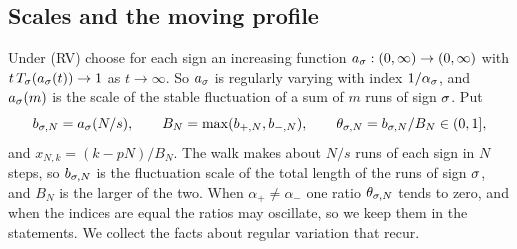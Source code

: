 \subsection{Scales and the moving profile}\label{sec:scales}

Under (RV) choose for each sign an increasing function
$a_\sigma:(0,\infty)\to(0,\infty)$ with $t\,T_\sigma(a_\sigma(t))\to1$ as
$t\to\infty$. So $a_\sigma$ is regularly varying with index $1/\alpha_\sigma$, and
$a_\sigma(m)$ is the scale of the stable fluctuation of a sum of $m$ runs of sign
$\sigma$. Put
\begin{equation}\label{eq:scales}
 b_{\sigma,N}=a_\sigma(N/s),\qquad B_N=\max(b_{{+},N},b_{{-},N}),\qquad
 \theta_{\sigma,N}=b_{\sigma,N}/B_N\in(0,1],
\end{equation}
and $x_{N,k}=(k-pN)/B_N$. The walk makes about $N/s$ runs of each sign in $N$
steps, so $b_{\sigma,N}$ is the fluctuation scale of the total length of the runs
of sign $\sigma$, and $B_N$ is the larger of the two. When
$\alpha_\plus\ne\alpha_\minus$ one ratio $\theta_{\sigma,N}$ tends to zero, and when
the indices are equal the ratios may oscillate, so we keep them in the
statements. We collect the facts about regular variation that recur.

